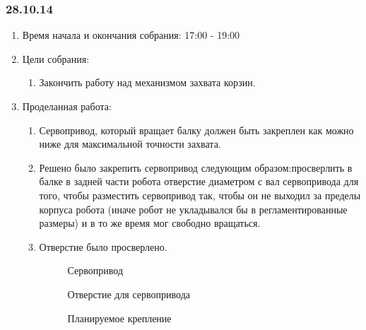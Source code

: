 
\subsubsection{28.10.14}

\begin{enumerate}
	\item Время начала и окончания собрания:
	17:00 - 19:00
	\item Цели собрания:
	\begin{enumerate}
	  \item Закончить работу над механизмом захвата корзин.
	  
    \end{enumerate}
    
	\item Проделанная работа:
	\begin{enumerate}
	  \item Сервопривод, который вращает балку должен быть закреплен как можно ниже для максимальной точности захвата.
      
      \item Решено было закрепить сервопривод следующим образом:просверлить в балке в задней части робота отверстие диаметром с вал сервопривода для того, чтобы разместить сервопривод так, чтобы он не выходил за пределы корпуса робота (иначе робот не укладывался бы в регламентированные размеры) и в то же время мог свободно вращаться.
      
      \item Отверстие было просверлено.
      
      \begin{figure}[H]
      	\begin{minipage}[h]{0.31\linewidth}
      		\caption{Сервопривод}
      	\end{minipage}
      	\hfill
      	\begin{minipage}[h]{0.31\linewidth}
      		\caption{Отверстие для сервопривода}
      	\end{minipage}
      	\hfill
      	\begin{minipage}[h]{0.31\linewidth}
      		\caption{Планируемое крепление}
      	\end{minipage}
      \end{figure}
      
    \end{enumerate}
    

\end{enumerate}

